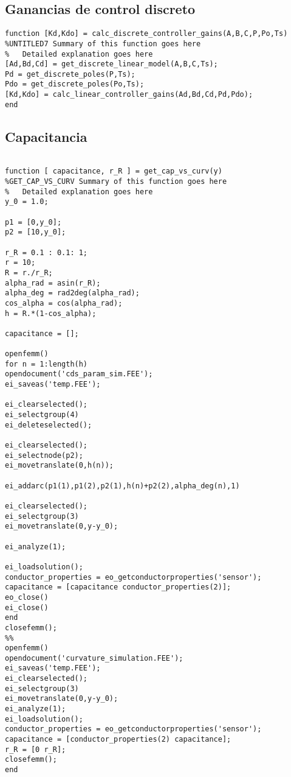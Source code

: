 \subsection{Ganancias de control  discreto}

\begin{lstlisting}[frame=single]
function [Kd,Kdo] = calc_discrete_controller_gains(A,B,C,P,Po,Ts)
%UNTITLED7 Summary of this function goes here
%   Detailed explanation goes here
[Ad,Bd,Cd] = get_discrete_linear_model(A,B,C,Ts);
Pd = get_discrete_poles(P,Ts);
Pdo = get_discrete_poles(Po,Ts);
[Kd,Kdo] = calc_linear_controller_gains(Ad,Bd,Cd,Pd,Pdo);
end

\end{lstlisting}

\subsection{Capacitancia}

\begin{lstlisting}[frame=single]

function [ capacitance, r_R ] = get_cap_vs_curv(y)
%GET_CAP_VS_CURV Summary of this function goes here
%   Detailed explanation goes here
y_0 = 1.0;

p1 = [0,y_0];
p2 = [10,y_0];

r_R = 0.1 : 0.1: 1;
r = 10;
R = r./r_R;
alpha_rad = asin(r_R);
alpha_deg = rad2deg(alpha_rad);
cos_alpha = cos(alpha_rad);
h = R.*(1-cos_alpha);

capacitance = [];

openfemm()
for n = 1:length(h)
opendocument('cds_param_sim.FEE');
ei_saveas('temp.FEE');

ei_clearselected();
ei_selectgroup(4)
ei_deleteselected();

ei_clearselected();
ei_selectnode(p2);
ei_movetranslate(0,h(n));

ei_addarc(p1(1),p1(2),p2(1),h(n)+p2(2),alpha_deg(n),1)

ei_clearselected();
ei_selectgroup(3)
ei_movetranslate(0,y-y_0);

ei_analyze(1);

ei_loadsolution();
conductor_properties = eo_getconductorproperties('sensor');
capacitance = [capacitance conductor_properties(2)];
eo_close()
ei_close()
end
closefemm();
%%
openfemm()
opendocument('curvature_simulation.FEE');
ei_saveas('temp.FEE');
ei_clearselected();
ei_selectgroup(3)
ei_movetranslate(0,y-y_0);
ei_analyze(1);
ei_loadsolution();
conductor_properties = eo_getconductorproperties('sensor');
capacitance = [conductor_properties(2) capacitance];
r_R = [0 r_R];
closefemm();
end
\end{lstlisting}

